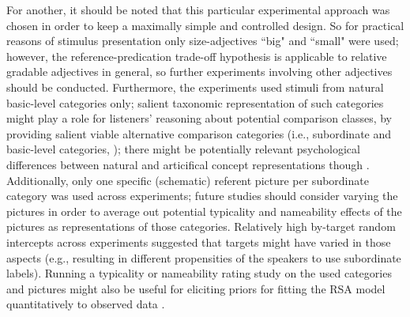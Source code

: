 For another, it should be noted that this particular experimental approach was chosen in order to keep a maximally simple and controlled design. So for practical reasons of stimulus presentation only size-adjectives ``big" and ``small" were used; however, the reference-predication trade-off hypothesis is applicable to relative gradable adjectives in general, so further experiments involving other adjectives should be conducted. 
Furthermore, the experiments used stimuli from natural basic-level categories only; salient taxonomic representation of such categories might play a role for listeners' reasoning about potential comparison classes, by providing salient viable alternative comparison categories (i.e., subordinate and basic-level categories, \textcite[cf.][]{rosch1976, tenenbaum2011grow}); there might be potentially relevant psychological differences between natural and articifical concept representations though %
 \parencite{kalish2002gold}. 
Additionally, only one specific (schematic) referent picture per subordinate category was used across experiments; future studies should consider varying the pictures in order to average out potential typicality and nameability effects of the pictures as representations of those categories. Relatively high by-target random intercepts across experiments suggested that targets might have varied in those aspects (e.g., resulting in different propensities of the speakers to use subordinate labels). Running a typicality or nameability rating study on the used categories and pictures might also be useful for eliciting priors for fitting the RSA model quantitatively to observed data \parencite{franke2016does}. %

